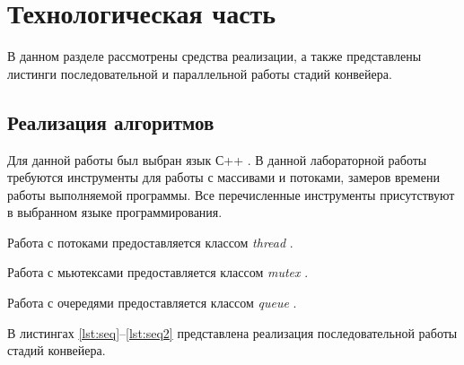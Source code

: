\chapter{Технологическая часть}
В данном разделе рассмотрены средства реализации, а также представлены листинги последовательной и параллельной работы стадий конвейера.

\section{Реализация алгоритмов}
Для данной работы был выбран язык С++ \cite{cpp}. В данной лабораторной работы требуются инструменты для работы с массивами и потоками, замеров времени работы выполняемой программы. Все перечисленные инструменты присутствуют в выбранном языке программирования.

Работа с потоками предоставляется классом \textit{thread} \cite{thread}.

Работа с мьютексами предоставляется классом \textit{mutex} \cite{mutex}.

Работа с очередями предоставляется классом \textit{queue} \cite{queue}.

В листингах \ref{lst:seq}--\ref{lst:seq2} представлена реализация последовательной работы стадий конвейера.

